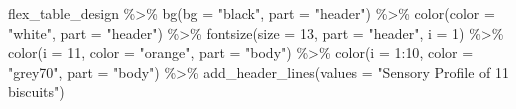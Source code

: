\documentclass[
]{krantz}
\makeatletter
\newenvironment{Shaded}{\begin{snugshade}}{\end{snugshade}}
\newcommand{\AttributeTok}[1]{\textcolor[rgb]{0.61,0.61,0.61}{#1}}
\newcommand{\DecValTok}[1]{\textcolor[rgb]{0.06,0.06,0.06}{#1}}
\newcommand{\FunctionTok}[1]{\textcolor[rgb]{0,0,0}{#1}}
\newcommand{\NormalTok}[1]{#1}
\newcommand{\SpecialCharTok}[1]{\textcolor[rgb]{0,0,0}{#1}}
\newcommand{\StringTok}[1]{\textcolor[rgb]{0.5,0.5,0.5}{#1}}
\newenvironment{kframe}{%
\medskip{}
\setlength{\fboxsep}{.8em}
 \def\at@end@of@kframe{}%
 \ifinner\ifhmode%
  \def\at@end@of@kframe{\end{minipage}}%
  \begin{minipage}{\columnwidth}%
 \fi\fi%
 \def\FrameCommand##1{\hskip\@totalleftmargin \hskip-\fboxsep
 \colorbox{shadecolor}{##1}\hskip-\fboxsep
     \hskip-\linewidth \hskip-\@totalleftmargin \hskip\columnwidth}%
 \MakeFramed {\advance\hsize-\width
   \@totalleftmargin\z@ \linewidth\hsize
   \@setminipage}}%
 {\par\unskip\endMakeFramed%
 \at@end@of@kframe}
\renewenvironment{Shaded}{\begin{kframe}}{\end{kframe}}
\makeatother
\begin{document}
\begin{Shaded}
\begin{Highlighting}[]
\NormalTok{flex\_table\_design }\SpecialCharTok{\%\textgreater{}\%}
  \FunctionTok{bg}\NormalTok{(}\AttributeTok{bg =} \StringTok{"black"}\NormalTok{, }\AttributeTok{part =} \StringTok{"header"}\NormalTok{) }\SpecialCharTok{\%\textgreater{}\%} 
  \FunctionTok{color}\NormalTok{(}\AttributeTok{color =} \StringTok{"white"}\NormalTok{, }\AttributeTok{part =} \StringTok{"header"}\NormalTok{) }\SpecialCharTok{\%\textgreater{}\%} 
  \FunctionTok{fontsize}\NormalTok{(}\AttributeTok{size =} \DecValTok{13}\NormalTok{, }\AttributeTok{part =} \StringTok{"header"}\NormalTok{, }\AttributeTok{i =} \DecValTok{1}\NormalTok{) }\SpecialCharTok{\%\textgreater{}\%}
  \FunctionTok{color}\NormalTok{(}\AttributeTok{i =} \DecValTok{11}\NormalTok{, }\AttributeTok{color =} \StringTok{"orange"}\NormalTok{, }\AttributeTok{part =} \StringTok{"body"}\NormalTok{) }\SpecialCharTok{\%\textgreater{}\%}
  \FunctionTok{color}\NormalTok{(}\AttributeTok{i =} \DecValTok{1}\SpecialCharTok{:}\DecValTok{10}\NormalTok{, }\AttributeTok{color =} \StringTok{"grey70"}\NormalTok{, }\AttributeTok{part =} \StringTok{"body"}\NormalTok{) }\SpecialCharTok{\%\textgreater{}\%} 
  \FunctionTok{add\_header\_lines}\NormalTok{(}\AttributeTok{values =} \StringTok{"Sensory Profile of 11 biscuits"}\NormalTok{)}
\end{Highlighting}
\end{Shaded}

\providecommand{\docline}[3]{\noalign{\global\setlength{\arrayrulewidth}{#1}}\arrayrulecolor[HTML]{#2}\cline{#3}}

\setlength{\tabcolsep}{0pt}

\renewcommand*{\arraystretch}{1.5}
\end{document}
